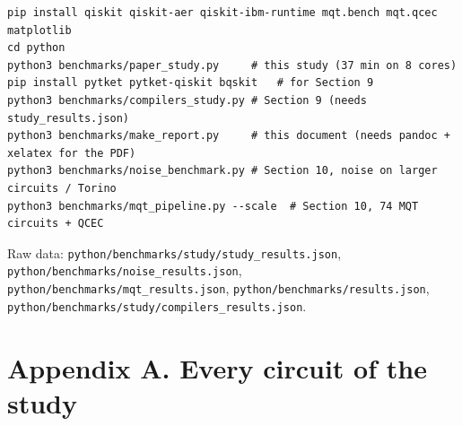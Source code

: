 \documentclass[
  10pt,
]{article}
\begin{document}
\begin{verbatim}
pip install qiskit qiskit-aer qiskit-ibm-runtime mqt.bench mqt.qcec matplotlib
cd python
python3 benchmarks/paper_study.py     # this study (37 min on 8 cores)
pip install pytket pytket-qiskit bqskit   # for Section 9
python3 benchmarks/compilers_study.py # Section 9 (needs study_results.json)
python3 benchmarks/make_report.py     # this document (needs pandoc + xelatex for the PDF)
python3 benchmarks/noise_benchmark.py # Section 10, noise on larger circuits / Torino
python3 benchmarks/mqt_pipeline.py --scale  # Section 10, 74 MQT circuits + QCEC
\end{verbatim}

Raw data: \texttt{python/benchmarks/study/study\_results.json},
\texttt{python/benchmarks/noise\_results.json},
\texttt{python/benchmarks/mqt\_results.json},
\texttt{python/benchmarks/results.json},
\texttt{python/benchmarks/study/compilers\_results.json}.

\section{Appendix A. Every circuit of the
study}\label{appendix-a.-every-circuit-of-the-study}
\end{document}

